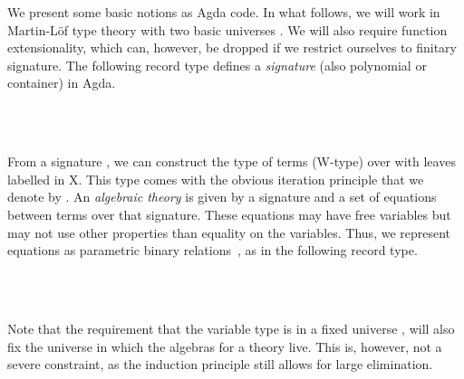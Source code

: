 \documentclass{easychair}
\begin{document}
We present some basic notions as Agda code.
In what follows, we will work in Martin-Löf type theory with two basic
universes \UZ{}\ofT\UO{}.
We will also require function extensionality, which can, however, be dropped
if we restrict ourselves to finitary signature.
The following record type defines a \emph{signature} (also polynomial or
container) in Agda.
\begin{code}%
\>[0]\AgdaSpace{}%
 \ofT \UO%
\AgdaSpace{}%
\<%
\\
\>[2][@{}l@{\AgdaIndent{0}}]%
\>[4]%
\>[9]\AgdaSymbol{:}\AgdaSpace{}%
\UZ\AgdaSpace{}%
\<%
\\
%
\>[4]%
\>[9]\AgdaSymbol{:}\AgdaSpace{}%
\AgdaSpace{}%
\AgdaSpace{}%
\UZ\AgdaSpace{}%
\<%
\end{code}
From a signature \sig \ofT {}, we can construct the type
 of terms (W-type) over \sig{} with leaves labelled in X.
This type comes with the obvious iteration principle that we denote by
.
An \emph{algebraic theory} is given by a signature and a set of equations
between terms over that signature.
These equations may have free variables but may not use other properties than
equality on the variables.
Thus, we represent equations as parametric binary
relations~\cite{Hermida14:LogicalRelationsParametricity}, as in the following
record type.
\begin{code}%
\>[0]\AgdaSpace{}%
\AgdaSpace{}%
\AgdaSymbol{:}\AgdaSpace{}%
\UO%
\AgdaSpace{}%
\<%
\\
\>[2][@{}l@{\AgdaIndent{0}}]%
\>[4]%
\>[9]\AgdaSymbol{:}\AgdaSpace{}%
\<%
\\
%
\>[4]%
\>[9]\AgdaSymbol{:}\AgdaSpace{}%
\AgdaSpace{}%
\AgdaSymbol{\{}\AgdaSpace{}%
\AgdaSymbol{:}\AgdaSpace{}%
\UZ\AgdaSpace{}%
\AgdaSymbol{\}}\AgdaSpace{}%
\AgdaSpace{}%
\AgdaSpace{}%
\AgdaSymbol{(}\AgdaSpace{}%
\AgdaSpace{}%
\AgdaSymbol{)}\<%
\end{code}
Note that the requirement that the variable type  is in a fixed
universe \UZ, will also fix the universe in which the algebras for
a theory live.
This is, however, not a severe constraint, as the induction principle still
allows for large elimination.
\end{document}

